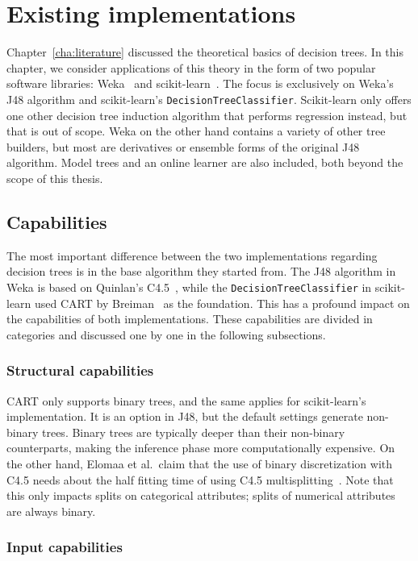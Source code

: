 \chapter{Existing implementations}\label{cha:software}
Chapter~\ref{cha:literature} discussed the theoretical basics of decision trees. In this chapter, we consider applications of this theory in the form of two popular software libraries: Weka~\cite{eibe2016weka} and scikit-learn~\cite{scikit-learn}. The focus is exclusively on Weka's J48 algorithm and scikit-learn's \texttt{DecisionTreeClassifier}. Scikit-learn only offers one other decision tree induction algorithm that performs regression instead, but that is out of scope. Weka on the other hand contains a variety of other tree builders, but most are derivatives or ensemble forms of the original J48 algorithm. Model trees and an online learner are also included, both beyond the scope of this thesis.

\section{Capabilities}
The most important difference between the two implementations regarding decision trees is in the base algorithm they started from. The J48 algorithm in Weka is based on Quinlan's C4.5~\cite{c45}, while the \texttt{DecisionTreeClassifier} in scikit-learn used CART by Breiman~\cite{cart} as the foundation. This has a profound impact on the capabilities of both implementations. These capabilities are divided in categories and discussed one by one in the following subsections.

\subsection{Structural capabilities}
CART only supports binary trees, and the same applies for scikit-learn's implementation. It is an option in J48, but the default settings generate non-binary trees. Binary trees are typically deeper than their non-binary counterparts, making the inference phase more computationally expensive. On the other hand, Elomaa et al.\ claim that the use of binary discretization with C4.5 needs about the half fitting time of using C4.5 multisplitting~\cite{elomaa1999general}. Note that this only impacts splits on categorical attributes; splits of numerical attributes are always binary.

\subsection{Input capabilities}
